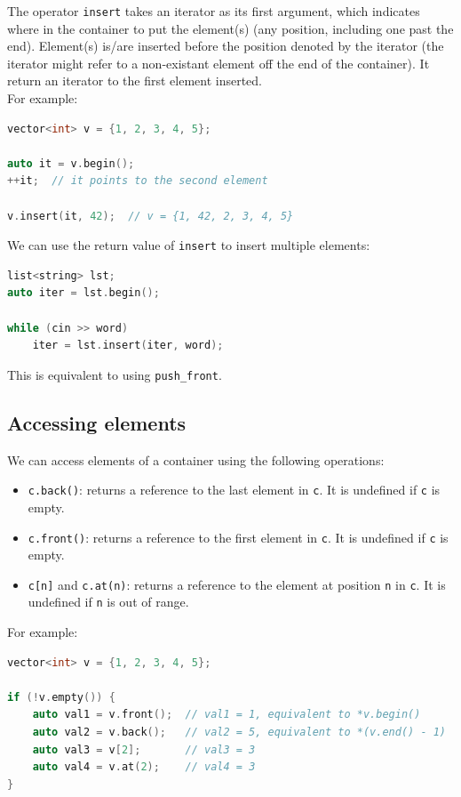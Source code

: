 The operator \texttt{insert} takes an iterator as its first argument, which indicates where in
the container to put the element(s) (any position, including one past the end). Element(s) is/are
inserted before the position denoted by the iterator (the iterator might refer to a non-existant
element off the end of the container). It return an iterator to the first element inserted.\\

For example:

\begin{lstlisting}[language=C++]
vector<int> v = {1, 2, 3, 4, 5};

auto it = v.begin();
++it;  // it points to the second element

v.insert(it, 42);  // v = {1, 42, 2, 3, 4, 5}
\end{lstlisting}

We can use the return value of \texttt{insert} to insert multiple elements:

\begin{lstlisting}[language=C++]
list<string> lst;
auto iter = lst.begin();

while (cin >> word)
    iter = lst.insert(iter, word);
\end{lstlisting}

This is equivalent to using \texttt{push\_front}.

\subsection{Accessing elements}

We can access elements of a container using the following operations:

\begin{itemize}
    \item \texttt{c.back()}: returns a reference to the last element in \texttt{c}. It is undefined
    if \texttt{c} is empty.
    \item \texttt{c.front()}: returns a reference to the first element in \texttt{c}. It is undefined
    if \texttt{c} is empty.
    \item \texttt{c[n]} and \texttt{c.at(n)}: returns a reference to the element at 
    position \texttt{n} in \texttt{c}. It is undefined if \texttt{n} is out of range.
\end{itemize}

For example:

\begin{lstlisting}[language=C++]
vector<int> v = {1, 2, 3, 4, 5};

if (!v.empty()) {
    auto val1 = v.front();  // val1 = 1, equivalent to *v.begin()
    auto val2 = v.back();   // val2 = 5, equivalent to *(v.end() - 1)
    auto val3 = v[2];       // val3 = 3
    auto val4 = v.at(2);    // val4 = 3
}
\end{lstlisting}

